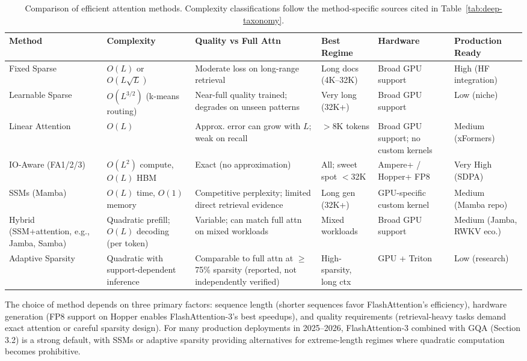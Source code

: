\documentclass[10pt,twocolumn]{article}
\newif\ifshrinkfloats
\newcommand{\sflt}[2]{\ifshrinkfloats#1\else#2\fi}
\begin{document}
\begin{table}[!tbp]
\centering
\sflt{\fontsize{11.2}{13.4}\selectfont}{\fontsize{11.2}{13.4}\selectfont}
\renewcommand{\arraystretch}{\sflt{1.55}{1.55}}
\caption{Comparison of efficient attention methods. Complexity classifications follow the method-specific sources cited in Table~\ref{tab:deep-taxonomy}.}
\label{tab:efficiency}
\setlength{\tabcolsep}{5pt}
\begin{tabular}{>{\raggedright\arraybackslash}p{2.4cm}>{\raggedright\arraybackslash}p{1.8cm}>{\raggedright\arraybackslash}p{2.5cm}>{\raggedright\arraybackslash}p{1.9cm}>{\raggedright\arraybackslash}p{1.9cm}>{\raggedright\arraybackslash}p{1.9cm}}
\toprule
Method & Complexity & Quality vs Full Attn & Best Regime & Hardware & Production Ready \\
\midrule
Fixed Sparse & $O(L)$ or $O(L\sqrt{L})$ & Moderate loss on long-range retrieval & Long docs (4K--32K) & Broad GPU support & High (HF integration) \\
Learnable Sparse & $O(L^{3/2})$ (k-means routing) & Near-full quality trained; degrades on unseen patterns & Very long (32K+) & Broad GPU support & Low (niche) \\
Linear Attention & $O(L)$ & Approx. error can grow with $L$; weak on recall & $>$8K tokens & Broad GPU support; no custom kernels & Medium (xFormers) \\
IO-Aware (FA1/2/3) & $O(L^2)$ compute, $O(L)$ HBM & Exact (no approximation) & All; sweet spot $<$32K & Ampere+ / Hopper+ FP8 & Very High (SDPA) \\
SSMs (Mamba) & $O(L)$ time, $O(1)$ memory & Competitive perplexity; limited direct retrieval evidence & Long gen (32K+) & GPU-specific custom kernel & Medium (Mamba repo) \\
Hybrid (SSM\allowbreak+attention, e.g., Jamba, Samba) & Quadratic prefill; $O(L)$ decoding (per token) & Variable; can match full attn on mixed workloads & Mixed workloads & Broad GPU support & Medium (Jamba, RWKV eco.) \\
Adaptive Sparsity & Quadratic with support-dependent inference & Comparable to full attn at $\ge$75\% sparsity (reported, not independently verified) & High-sparsity, long ctx & GPU + Triton & Low (research) \\
\bottomrule
\end{tabular}
\end{table}

The choice of method depends on three primary factors: sequence length (shorter sequences favor FlashAttention's efficiency), hardware generation (FP8 support on Hopper enables FlashAttention-3's best speedups), and quality requirements (retrieval-heavy tasks demand exact attention or careful sparsity design). For many production deployments in 2025--2026, FlashAttention-3 combined with GQA (Section 3.2) is a strong default, with SSMs or adaptive sparsity providing alternatives for extreme-length regimes where quadratic computation becomes prohibitive.
\end{document}
